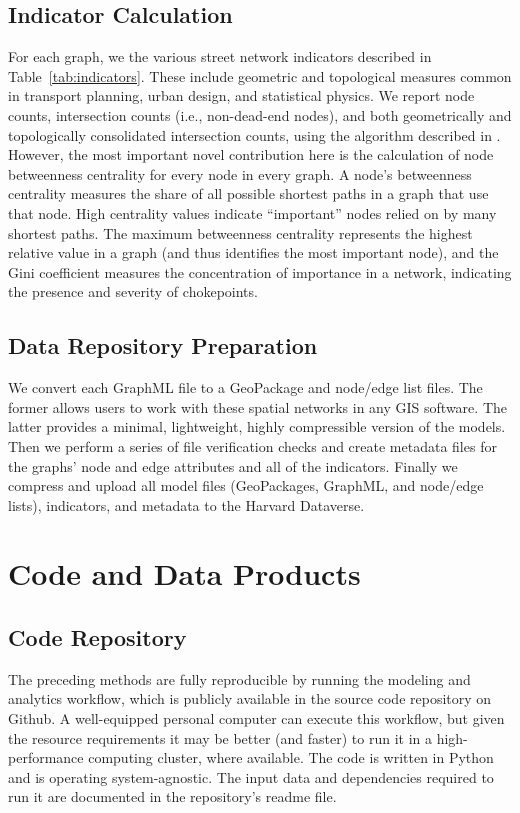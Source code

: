 \documentclass[12pt,letterpaper]{article} %
\begin{document}
\subsection{Indicator Calculation}

For each graph, we the various street network indicators described in Table~\ref{tab:indicators}. These include geometric and topological measures common in transport planning, urban design, and statistical physics. We report node counts, intersection counts (i.e., non-dead-end nodes), and both geometrically and topologically consolidated intersection counts, using the algorithm described in \citet{boeing_topological_2025}. However, the most important novel contribution here is the calculation of node betweenness centrality for every node in every graph. A node's betweenness centrality measures the share of all possible shortest paths in a graph that use that node. High centrality values indicate \enquote{important} nodes relied on by many shortest paths. The maximum betweenness centrality represents the highest relative value in a graph (and thus identifies the most important node), and the Gini coefficient measures the concentration of importance in a network, indicating the presence and severity of chokepoints.

\subsection{Data Repository Preparation}

We convert each GraphML file to a GeoPackage and node/edge list files. The former allows users to work with these spatial networks in any GIS software. The latter provides a minimal, lightweight, highly compressible version of the models. Then we perform a series of file verification checks and create metadata files for the graphs' node and edge attributes and all of the indicators. Finally we compress and upload all model files (GeoPackages, GraphML, and node/edge lists), indicators, and metadata to the Harvard Dataverse.

\section{Code and Data Products}

\subsection{Code Repository}

The preceding methods are fully reproducible by running the modeling and analytics workflow, which is publicly available in the source code repository on Github. A well-equipped personal computer can execute this workflow, but given the resource requirements it may be better (and faster) to run it in a high-performance computing cluster, where available. The code is written in Python and is operating system-agnostic. The input data and dependencies required to run it are documented in the repository's readme file.
\end{document}
